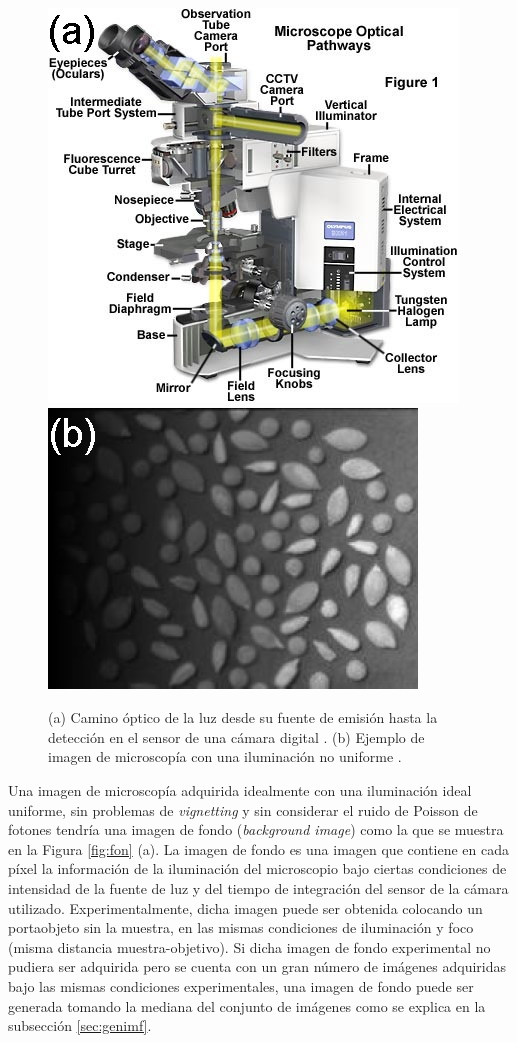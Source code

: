 \begin{figure}[H]
\hfill%
\includegraphics[scale=1.0]{Figs/defectosZEISS/opticalpaths.jpg}
\hfill%
\includegraphics[scale=1.0]{Figs/cuantificaciondefectos/ilumnoun.png}
\hfill%
\hfill%
\caption{(a) Camino óptico de la luz desde su fuente de emisión hasta la detección en el sensor de una cámara digital \cite{olyyyy}. (b) Ejemplo de imagen de microscopía con una iluminación no uniforme \cite{nunifor}.}
\label{fig:micrososcuro}
	\end{figure}
	
Una imagen de microscopía adquirida idealmente con una iluminación ideal uniforme, sin problemas de  \textit{vignetting} y sin considerar el ruido de Poisson de fotones tendría una imagen de fondo (\textit{background image}) como la que se muestra en la Figura \ref{fig:fon} (a). La imagen de fondo es una imagen que contiene en cada píxel la información de la iluminación del microscopio bajo ciertas condiciones de intensidad de la fuente de luz y del tiempo de integración del sensor de la cámara utilizado. Experimentalmente, dicha imagen puede ser obtenida colocando un portaobjeto sin la muestra, en las mismas condiciones de iluminación y foco (misma distancia muestra-objetivo). Si dicha imagen de fondo experimental no pudiera ser adquirida pero se cuenta con un gran número de imágenes adquiridas bajo las mismas condiciones experimentales, una imagen de fondo puede ser generada tomando la mediana del conjunto de imágenes como se explica en la subsección \ref{sec:genimf}.

